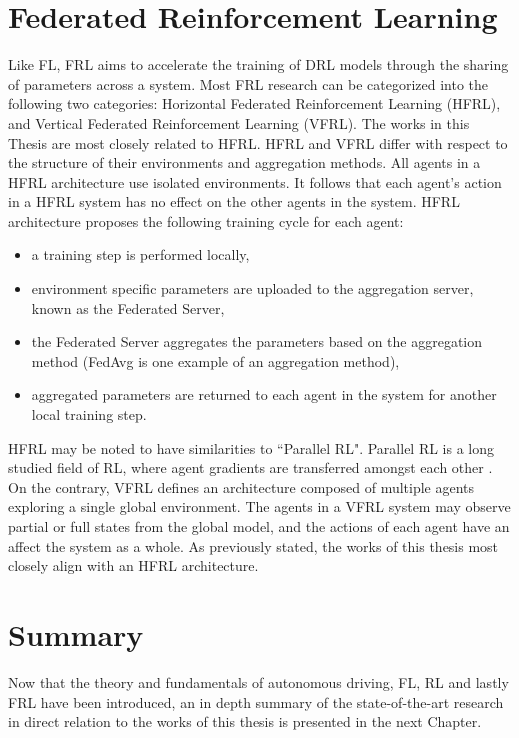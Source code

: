 \section{Federated Reinforcement Learning}
Like FL, FRL aims to accelerate the training of DRL models through the sharing of parameters across a system. Most FRL research can be categorized into the following two categories: Horizontal Federated Reinforcement Learning (HFRL), and Vertical Federated Reinforcement Learning (VFRL).  The works in this Thesis are most closely related to HFRL.  HFRL and VFRL differ with respect to the structure of their environments and aggregation methods.  All agents in a HFRL architecture use isolated environments. It follows that each agent's action in a HFRL system has no effect on the other agents in the system.  HFRL architecture proposes the following training cycle for each agent: 

\begin{itemize}
    \item a training step is performed locally, 
    \item environment specific parameters are uploaded to the aggregation server, known as the Federated Server,
    \item the Federated Server aggregates the parameters based on the aggregation method (FedAvg is one example of an aggregation method),
    \item aggregated parameters are returned to each agent in the system for another local training step.
\end{itemize} 

HFRL may be noted to have similarities to ``Parallel RL".  Parallel RL is a long studied field of RL, where agent gradients are transferred amongst each other \cite{Lim2020, Nadiger2019}.  On the contrary, VFRL defines an architecture composed of multiple agents exploring a single global environment. The agents in a VFRL system may observe partial or full states from the global model, and the actions of each agent have an affect the system as a whole. As previously stated, the works of this thesis most closely align with an HFRL architecture.

\section{Summary}
Now that the theory and fundamentals of autonomous driving, FL, RL and lastly FRL have been introduced, an in depth summary of the state-of-the-art research in direct relation to the works of this thesis is presented in the next Chapter.